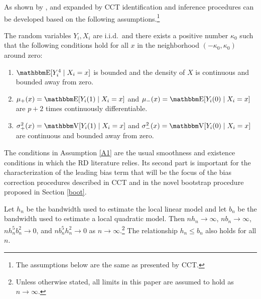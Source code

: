 \documentclass[12pt,fleqn]{article}
\begin{document}
As shown by \cite{HTV2001}, \cite{Porter03} and expanded by CCT identification and inference procedures can be developed based on the following assumptions.\footnote{The assumptions below are the same as presented by CCT.}

\begin{assumption}\label{A1}
  The random variables $Y_{i}, X_{i}$ are i.i.d.\ and
  there exists a positive number $\kappa_0$ such that the following
  conditions hold for all $x$ in the neighborhood
  $(-\kappa_{0},\kappa_{0})$ around zero:
  \begin{enumerate}
  \item $\E[Y_{i}^{4} \mid X_{i}=x]$ is bounded and the density of $X$
    is continuous and bounded away from zero.
  \item $\mu_{+}(x) = \E[ Y_{i}(1) \mid X_{i}=x ]$ and
    $\mu_{-}(x) = \E[ Y_{i}(0) \mid X_{i}=x ]$ are $p+2$ times
    continuously differentiable.
  \item $\sigma^{2}_{+}(x)=\V[ Y_{i}(1) \mid X_{i}=x ]$ and
    $\sigma^{2}_{-}(x)=\V[ Y_{i}(0) \mid X_{i}=x ]$ are continuous and
    bounded away from zero.
 \end{enumerate}
\end{assumption}

The conditions in Assumption \ref{A1} are the usual smoothness and existence conditions in which the RD literature relies. Its second part is important for the characterization of the leading bias term that will be the focus of the bias correction procedures described in CCT and in the novel  bootstrap procedure proposed in Section \ref{boot}.

\begin{assumption}[Bandwidth]\label{A2}
  Let $h_{n}$ be the bandwidth used to estimate the local linear model and let
  $b_{n}$ be the bandwidth used to estimate a local quadratic model. Then
  $n h_{n} \to \infty$, $n b_{n} \to \infty$, $n h_{n}^{5} b_{n}^{2} \to 0$, and
  $n b_{n}^{5} h_{n}^{2} \to 0$ as $n \to \infty$.\footnote{%
    Unless otherwise stated, all limits in this paper are assumed to hold as
    $n \to \infty$.} %
  The relationship $h_{n} \leq b_{n}$ also holds for all $n$.
\end{assumption}
\end{document}
